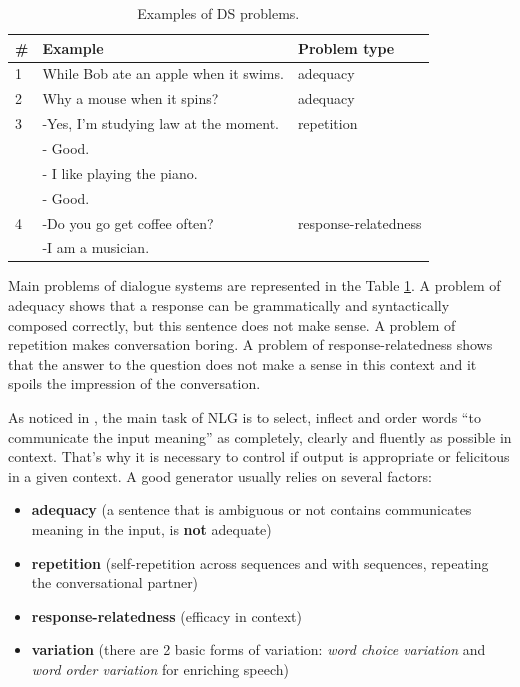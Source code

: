 \begin{table}[ht]
\centering
 \begin{tabular}{|p{0.5cm}|p{8cm}|p{4cm}|} 
 \hline
 \textbf{\#} & \textbf{Example} & \textbf{Problem type} \\
 \hline
 1 & While Bob ate an apple when it swims. & adequacy\\
 \hline
 2 & Why a mouse when it spins? & adequacy \\
 \hline
 3 &  -Yes, I'm studying law at the moment. & repetition\\
   & - Good. & \\
   & - I like playing the piano. & \\
   & - Good.  & \\
\hline
4 & -Do you go get coffee often? & response-relatedness \\
  & -I am a musician. & \\
\hline
 \end{tabular}
 \caption{Examples of DS problems.}
\label{tab:ds_probs}
\end{table}
Main problems of dialogue systems are represented in the Table \ref{tab:ds_probs}. A problem of adequacy shows that a response can be grammatically and syntactically composed correctly, but this sentence does not make sense. A problem of repetition makes conversation boring. A problem of response-relatedness shows that the answer to the question does not make a sense in this context and it spoils the impression of the conversation.

As noticed in \cite{stent2005evaluating}, the main task of NLG is to select, inflect and order words ``to communicate the input meaning'' as completely, clearly and fluently as possible in context. That's why it is necessary to control if output is appropriate or felicitous in a given context. A good generator usually relies on several factors:
\begin{itemize}
  \item \textbf{adequacy} (a sentence that is ambiguous or not contains communicates meaning in the input, is \textbf{not} adequate)
  \item \textbf{repetition} (self-repetition across sequences and with sequences, repeating the conversational partner)
  \item \textbf{response-relatedness} (efficacy in context)
  \item \textbf{variation} (there are 2 basic forms of variation: \textit{word choice variation} and \textit{word order variation} for enriching speech)
\end{itemize}

